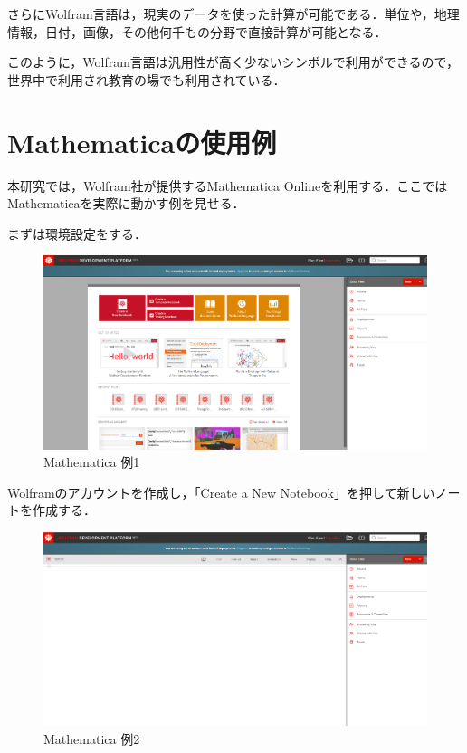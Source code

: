 さらにWolfram言語は，現実のデータを使った計算が可能である．単位や，地理情報，日付，画像，その他何千もの分野で直接計算が可能となる．

このように，Wolfram言語は汎用性が高く少ないシンボルで利用ができるので，世界中で利用され教育の場でも利用されている．

\clearpage

\section{Mathematicaの使用例}

本研究では，Wolfram社が提供するMathematica Onlineを利用する．ここではMathematicaを実際に動かす例を見せる．

まずは環境設定をする．

\begin{figure}[h]
\centering
\includegraphics[width=15cm]{mathematica2.png}
\caption{Mathematica 例1}\label{図}
\end{figure}

Wolframのアカウントを作成し，「Create a New Notebook」を押して新しいノートを作成する．

\begin{figure}[h]
\centering
\includegraphics[width=15cm]{mathematica3.png}
\caption{Mathematica 例2}\label{図}
\end{figure}

